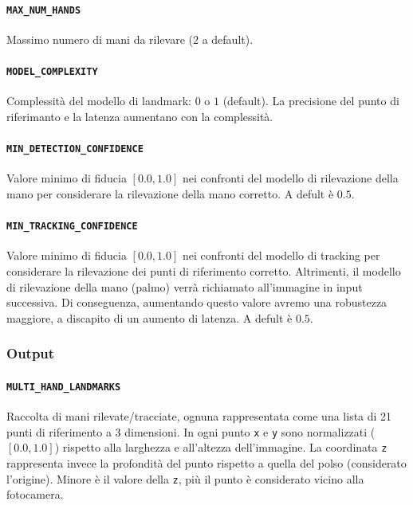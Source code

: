 \paragraph{\texttt{MAX\_NUM\_HANDS}} Massimo numero di mani da rilevare ($2$ a default).

\paragraph{\texttt{MODEL\_COMPLEXITY}} Complessità del modello di landmark: $0$ o $1$ (default). La precisione del punto di riferimanto e la latenza aumentano con la complessità.

\paragraph{\texttt{MIN\_DETECTION\_CONFIDENCE}} Valore minimo di fiducia $[0.0, 1.0]$ nei confronti del modello di rilevazione della mano per considerare la rilevazione della mano corretto. A defult è $0.5$.

\paragraph{\texttt{MIN\_TRACKING\_CONFIDENCE}} Valore minimo di fiducia $[0.0, 1.0]$ nei confronti del modello di tracking per considerare la rilevazione dei punti di riferimento corretto. Altrimenti, il modello di rilevazione della mano (palmo) verrà richiamato all'immagine in input successiva. Di conseguenza, aumentando questo valore avremo una robustezza maggiore, a discapito di un aumento di latenza. A defult è $0.5$.

\newpage
\subsubsection{Output}
\label{chap:landmarks}

\paragraph{\texttt{MULTI\_HAND\_LANDMARKS}} Raccolta di mani rilevate/tracciate, ognuna rappresentata come una lista di 21 punti di riferimento a 3 dimensioni. In ogni punto \texttt{x} e \texttt{y} sono normalizzati ($[0.0, 1.0]$) rispetto alla larghezza e all'altezza dell'immagine. La coordinata \texttt{z} rappresenta invece la profondità del punto rispetto a quella del polso (considerato l'origine). Minore è il valore della \texttt{z}, più il punto è considerato vicino alla fotocamera.

